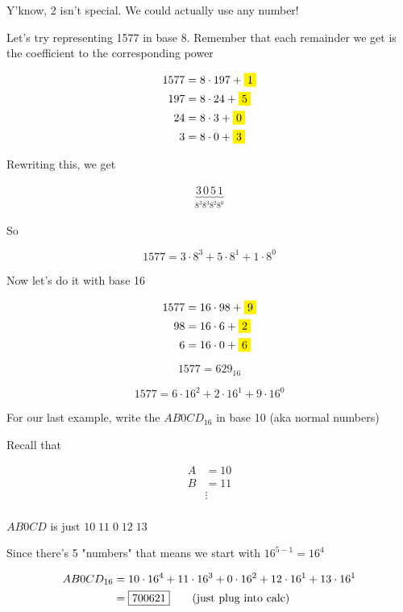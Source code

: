 \documentclass[../../Main.tex]{subfiles}
\begin{document}
Y'know, 2 isn't special. We could actually use any number!

Let's try representing 1577 in base 8. Remember that each remainder we get is the coefficient to the corresponding power

\begin{align*}
    1577 &= 8 \cdot 197 + \yellowbox{1} \\
    197 &= 8 \cdot 24 + \yellowbox{5} \\
    24 &= 8 \cdot 3 + \yellowbox{0} \\
    3 &= 8 \cdot 0 + \yellowbox{3} \\
\end{align*}

Rewriting this, we get

\begin{align*}
    \underbrace{3}_{8^3}
    \underbrace{0}_{8^3}
    \underbrace{5}_{8^2}
    \underbrace{1}_{8^0}
\end{align*}

So 

$$1577 = 3 \cdot 8^3 + 5 \cdot 8^1 + 1 \cdot 8^0$$

Now let's do it with base 16

\begin{align*}
    1577 &= 16 \cdot 98 + \yellowbox{9} \\
    98 &= 16 \cdot 6 + \yellowbox{2} \\
    6 &= 16 \cdot 0 + \yellowbox{6} \\
\end{align*}

$$\boxed{1577 = 629_{16}}$$

$$1577 = 6 \cdot 16^2 + 2 \cdot 16^1 + 9 \cdot 16^0$$

For our last example, write the $AB0CD_{16}$ in base 10 (aka normal numbers)

Recall that

\begin{align*}
    A &= 10 \\
    B &= 11 \\
    &\vdots \\
\end{align*}

$AB0CD$ is just $10 \; 11 \; 0 \; 12 \; 13$

Since there's 5 "numbers" that means we start with $16^{5 - 1} = 16^4$

\begin{align*}
    AB0CD_{16} &= 10 \cdot 16^4 + 11 \cdot 16^3 + 0 \cdot 16^2 + 12 \cdot 16^1 + 13 \cdot 16^1 \\
    &= \boxed{700621} \tag{\text{just plug into calc}}
\end{align*}

\end{document}
